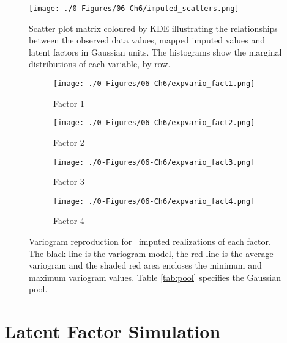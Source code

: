 \begin{figure}[htb!]
    \centering
    \texttt{[image: ./0-Figures/06-Ch6/imputed\_scatters.png]}
    \caption{Scatter plot matrix coloured by \gls{KDE} illustrating the relationships between the observed data values, mapped imputed values and latent factors in Gaussian units. The histograms show the marginal distributions of each variable, by row. }
    \label{fig:imputed_scatters}
\end{figure}

\begin{figure}
    \begin{subfigure}{1.0\textwidth}
        \centering
        \texttt{[image: ./0-Figures/06-Ch6/expvario\_fact1.png]}
        \caption{Factor 1}
    \end{subfigure}
    \begin{subfigure}{1.0\textwidth}
        \centering
        \texttt{[image: ./0-Figures/06-Ch6/expvario\_fact2.png]}
        \caption{Factor 2}
    \end{subfigure}
    \begin{subfigure}{1.0\textwidth}
        \centering
        \texttt{[image: ./0-Figures/06-Ch6/expvario\_fact3.png]}
        \caption{Factor 3}
    \end{subfigure}
    \begin{subfigure}{1.0\textwidth}
        \centering
        \texttt{[image: ./0-Figures/06-Ch6/expvario\_fact4.png]}
        \caption{Factor 4}
    \end{subfigure}
    \caption{Variogram reproduction for \csnreals \ imputed realizations of each factor. The black line is the variogram model, the red line is the average variogram and the shaded red area encloses the minimum and maximum variogram values. Table \ref{tab:pool} specifies the Gaussian pool.}
    \label{fig:nmrimp_repro_gvario}
\end{figure}


\FloatBarrier
\section{Latent Factor Simulation}
\label{sec:fact_sim}

